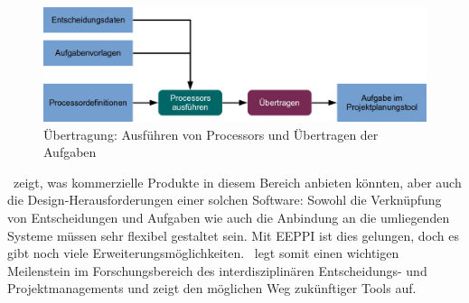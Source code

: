 	\begin{figure}[H]
		\includegraphics[width=\textwidth]{introduction/img/simpleProcessWorkflow.jpg}
		\centering
		\caption{Übertragung: Ausführen von Processors und Übertragen der Aufgaben}
		\label{fig:metamapping}
	\end{figure}
	
	\eeppi\ zeigt, was kommerzielle Produkte in diesem Bereich anbieten könnten,
	aber auch die Design-Herausforderungen einer solchen Software: 
	Sowohl die Verknüpfung von Entscheidungen und Aufgaben wie auch die Anbindung an die umliegenden Systeme müssen sehr flexibel gestaltet sein.
	Mit EEPPI ist dies gelungen, doch es gibt noch viele Erweiterungsmöglichkeiten.
	\eeppi\ legt somit einen wichtigen Meilenstein im Forschungsbereich des interdisziplinären Entscheidungs- und Projektmanagements und
	zeigt den möglichen Weg zukünftiger Tools auf.
	
	\captionsetup[figure]{labelformat=default} %